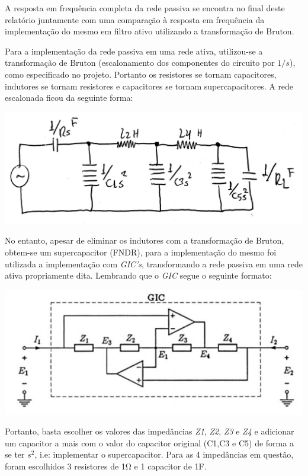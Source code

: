 \documentclass{article}
\begin{document}
A resposta em frequência completa da rede passiva se encontra no final deste relatório juntamente com uma comparação à resposta em frequência da implementação do mesmo em filtro ativo utilizando a transformação de Bruton.

Para a implementação da rede passiva em uma rede ativa, utilizou-se a transformação de Bruton (escalonamento dos componentes do circuito por $1/s$), como especificado no projeto. Portanto os resistores se tornam capacitores, indutores se tornam resistores e capacitores se tornam supercapacitores. A rede escalonada ficou da seguinte forma: 

\begin{center}
\centering
  \includegraphics[scale=0.08]{img/circuitoTransf.JPG}
\end{center}

No entanto, apesar de eliminar os indutores com a transformação de Bruton, obtem-se um supercapacitor (FNDR), para a implementação do mesmo foi utilizada a implementação com \textit{GIC's}, transformando a rede passiva em uma rede ativa propriamente dita. Lembrando que o \textit{GIC} segue o seguinte formato:

\begin{center}
\centering
  \includegraphics[scale=0.6]{img/gic.png}
\end{center}

Portanto, basta escolher os valores das impedâncias \textit{Z1}, \textit{Z2}, \textit{Z3} e \textit{Z4} e adicionar um capacitor a mais com o valor do capacitor original (C1,C3 e C5) de forma a se ter $s^2$, i.e: implementar o supercapacitor. Para as 4 impedâncias em questão, foram escolhidos 3 resistores de 1\si{\ohm} e 1 capacitor de 1F.
\end{document}
